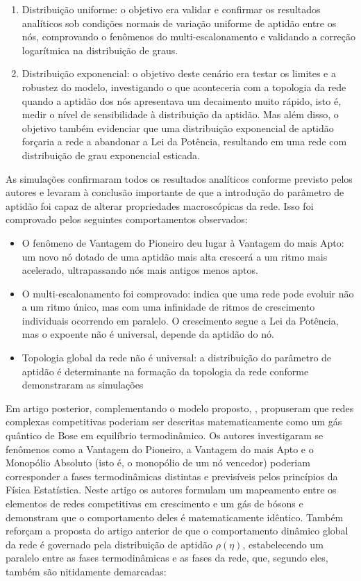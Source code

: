 \documentclass[12pt,oneside,a4paper,brazil,sumario=tradicional]{abntex2}
\begin{document}
\begin{enumerate}
  \item Distribuição uniforme: o objetivo era validar e confirmar os resultados analíticos sob condições normais de variação uniforme de aptidão entre os nós, comprovando o fenômenos do multi-escalonamento e validando a correção logarítmica na distribuição de graus.
  \item Distribuição exponencial: o objetivo deste cenário era testar os limites e a robustez do modelo, investigando o que aconteceria com a topologia da rede quando a aptidão dos nós apresentava um decaimento muito rápido, isto é, medir o nível de sensibilidade à distribuição da aptidão. Mas além disso, o objetivo também evidenciar que uma distribuição exponencial de aptidão forçaria a rede a abandonar a Lei da Potência, resultando em uma rede com distribuição de grau exponencial esticada.
\end{enumerate}

As simulações confirmaram todos os resultados analíticos conforme previsto pelos autores e levaram à conclusão importante de que a introdução do parâmetro de aptidão foi capaz de alterar propriedades macroscópicas da rede. Isso foi comprovado pelos seguintes comportamentos observados:

\begin{itemize}
  \item O fenômeno de Vantagem do Pioneiro deu lugar à Vantagem do mais Apto: um novo nó dotado de uma aptidão mais alta crescerá a um ritmo mais acelerado, ultrapassando nós mais antigos  menos aptos.
\end{itemize}
\begin{itemize}
  \item O multi-escalonamento foi comprovado: indica que uma rede pode evoluir não a um ritmo único, mas com uma infinidade de ritmos de crescimento individuais ocorrendo  em paralelo. O crescimento segue a Lei da Potência, mas o expoente não é universal, depende da aptidão do nó.
  \item Topologia global da rede não é universal: a distribuição do parâmetro de aptidão é determinante na formação da topologia da rede conforme demonstraram as simulações
\end{itemize}

Em artigo posterior, complementando o modelo proposto, \textcite{bianconi2001b}, propuseram que redes complexas competitivas poderiam ser descritas matematicamente como um gás quântico de Bose em equilíbrio termodinâmico. Os autores investigaram se fenômenos como a Vantagem do Pioneiro, a Vantagem do mais Apto e o Monopólio Absoluto (isto é, o monopólio de um nó vencedor) poderiam corresponder a fases termodinâmicas distintas e previsíveis pelos princípios da Física Estatística. Neste artigo os autores formulam um mapeamento entre os elementos de redes competitivas em crescimento e um gás de bósons e demonstram que o comportamento deles é matematicamente idêntico. Também reforçam a proposta do artigo anterior de que o comportamento dinâmico global da rede é governado pela distribuição de aptidão $\rho(\eta)$, estabelecendo um paralelo entre as fases termodinâmicas e as fases da rede, que, segundo eles, também são nitidamente demarcadas:
\end{document}
